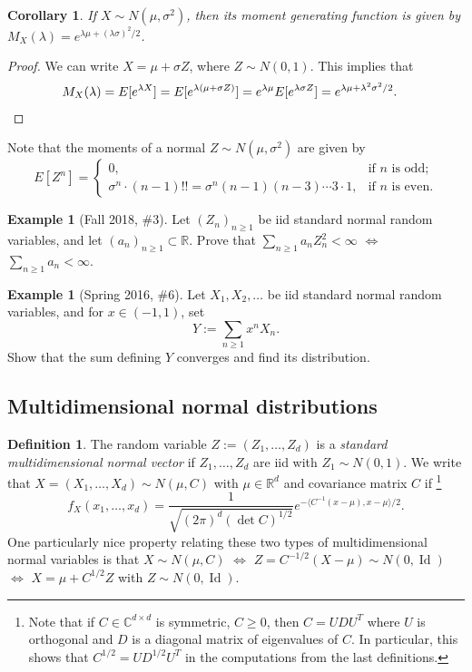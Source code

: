\documentclass[12pt,reqno]{article}
\renewcommand{\emph}[1]{\textit{#1}}
\theoremstyle{plain}
\newtheorem{cor}[theorem]{Corollary}
\theoremstyle{definition}
\newtheorem{definition}[theorem]{Definition}
\newtheorem{example}[theorem]{Example}
\begin{document}
\begin{cor}
If $X \sim N(\mu,\sigma^2)$, then its moment generating function is 
given by $M_X(\lambda) = e^{\lambda\mu+(\lambda\sigma)^2 / 2}$. 
\end{cor} 
\begin{proof} 
We can write $X = \mu + \sigma Z$, where $Z \sim N(0, 1)$. This implies 
that 
\begin{align*} 
M_X(\lambda) & = E[e^{\lambda X}] = E[e^{\lambda(\mu+\sigma Z)}] 
     = e^{\lambda\mu} E[e^{\lambda\sigma Z}] = 
     e^{\lambda\mu+\lambda^2\sigma^2 / 2}. 
     \qedhere 
\end{align*} 
\end{proof} 
Note that the moments of a normal $Z \sim N(\mu, \sigma^2)$ are given by 
\[
E[Z^n] = \begin{cases} 
     0, & \text{if $n$ is odd; } \\ 
     \sigma^n \cdot (n-1)!! = \sigma^n (n-1)(n-3)\cdots 3 \cdot 1, & \text{if $n$ is even.} 
     \end{cases} 
\]

\begin{example}[Fall 2018, \#3]
Let $(Z_n)_{n \geq 1}$ be iid standard normal random variables, and let 
$(a_n)_{n \geq 1} \subset \mathbb{R}$. Prove that 
$\sum_{n \geq 1} a_n Z_n^2 < \infty$ $\iff$ $\sum_{n \geq 1} a_n < \infty$. 
\end{example} 

\begin{example}[Spring 2016, \#6]
Let $X_1,X_2,\ldots$ be iid standard normal random variables, and for 
$x \in (-1, 1)$, set 
\[
Y := \sum_{n \geq 1} x^n X_n. 
\]
Show that the sum defining $Y$ converges and find its distribution. 
\end{example}

\subsection{Multidimensional normal distributions} 

\begin{definition} 
The random variable $Z := (Z_1,\ldots,Z_d)$ is a 
\emph{standard multidimensional normal vector} if $Z_1,\ldots,Z_d$ are 
iid with $Z_1 \sim N(0, 1)$. We write that 
$X = (X_1,\ldots,X_d) \sim N(\mu,C)$ with $\mu \in \mathbb{R}^d$ and 
covariance matrix $C$ if \footnote{
     Note that if $C \in \mathbb{C}^{d \times d}$ is symmetric, 
     $C \geq 0$, then 
     $C = UDU^T$ where $U$ is orthogonal and $D$ is a diagonal matrix of 
     eigenvalues of $C$. In particular, this shows that 
     $C^{1/2} = UD^{1/2}U^T$ in the computations from the last definitions. 
} 
\[
f_X(x_1,\ldots,x_d) = \frac{1}{\sqrt{(2\pi)^d (\det C)^{1/2}}} 
     e^{-\langle C^{-1}(x-\mu),x-\mu \rangle / 2}. 
\]
One particularly nice property relating these two types of multidimensional 
normal variables is that 
$X \sim N(\mu, C)$ $\iff$ $Z = C^{-1/2}(X-\mu) \sim N(0, \operatorname{Id})$ 
$\iff$ $X = \mu + C^{1/2} Z$ with $Z \sim N(0, \operatorname{Id})$. 
\end{definition} 
\end{document}
